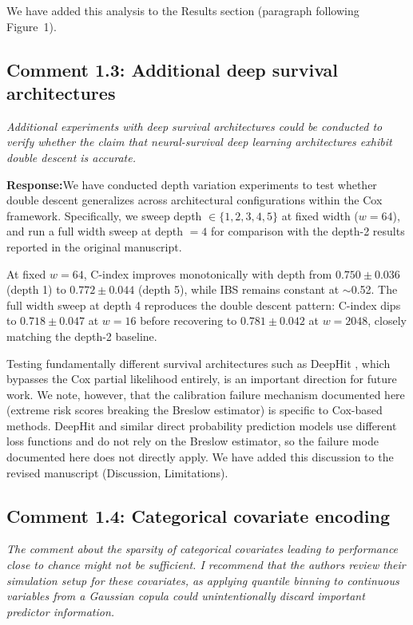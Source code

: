 \documentclass[12pt,a4paper]{article}
\newcommand{\comment}[1]{%
  \begin{reviewerbox}
    \textit{#1}
  \end{reviewerbox}
}
\newcommand{\response}{\noindent\textbf{Response:}\quad}
\begin{document}
We have added this analysis to the Results section (paragraph following
Figure~1).


\bigskip

\subsection*{Comment 1.3: Additional deep survival architectures}

\comment{Additional experiments with deep survival architectures could be conducted to verify whether the claim that neural-survival deep learning architectures exhibit double descent is accurate.}

\response We have conducted depth variation experiments to test whether
double descent generalizes across architectural configurations within the
Cox framework. Specifically, we sweep depth $\in \{1, 2, 3, 4, 5\}$ at fixed
width ($w = 64$), and run a full width sweep at depth $= 4$ for comparison
with the depth-2 results reported in the original manuscript.

At fixed $w = 64$, C-index improves monotonically with depth from
$0.750 \pm 0.036$ (depth 1) to $0.772 \pm 0.044$ (depth 5), while IBS
remains constant at $\sim$0.52. The full width sweep at depth 4 reproduces
the double descent pattern: C-index dips to $0.718 \pm 0.047$ at $w = 16$
before recovering to $0.781 \pm 0.042$ at $w = 2048$, closely matching
the depth-2 baseline.

Testing fundamentally different survival architectures such as DeepHit
\citep{lee2018deephit}, which bypasses the Cox partial likelihood entirely,
is an important direction for future work. We note, however, that the
calibration failure mechanism documented here (extreme risk scores breaking
the Breslow estimator) is specific to Cox-based methods. DeepHit and similar
direct probability prediction models use different loss functions and do not
rely on the Breslow estimator, so the failure mode documented here does not
directly apply. We have added this discussion to the revised manuscript
(Discussion, Limitations).


\bigskip

\subsection*{Comment 1.4: Categorical covariate encoding}

\comment{The comment about the sparsity of categorical covariates leading to performance close to chance might not be sufficient. I recommend that the authors review their simulation setup for these covariates, as applying quantile binning to continuous variables from a Gaussian copula could unintentionally discard important predictor information.}
\end{document}
